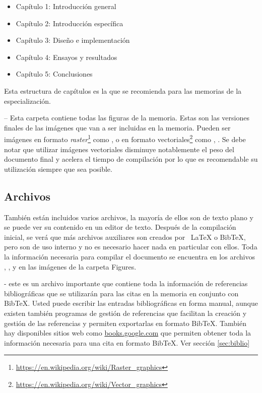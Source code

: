 \begin{itemize}
\item Capítulo 1: Introducción general	
\item Capítulo 2: Introducción específica
\item Capítulo 3: Diseño e implementación
\item Capítulo 4: Ensayos y resultados
\item Capítulo 5: Conclusiones

\end{itemize}

Esta estructura de capítulos es la que se recomienda para las memorias de la especialización.

 -- Esta carpeta contiene todas las figuras de la memoria.  Estas son las versiones finales de las imágenes que van a ser incluidas en la memoria.  Pueden ser imágenes en formato \textit{raster}\footnote{\url{https://en.wikipedia.org/wiki/Raster_graphics}} como ,  o en formato vectoriales\footnote{\url{https://en.wikipedia.org/wiki/Vector_graphics}} como , .  Se debe notar que utilizar imágenes vectoriales disminuye notablemente el peso del documento final y acelera el tiempo de compilación por lo que es recomendable su utilización siempre que sea posible.

\subsection{Archivos}

También están incluidos varios archivos, la mayoría de ellos son de texto plano y se puede ver su contenido en un editor de texto. Después de la compilación inicial, se verá que más archivos auxiliares son creados por \ LaTeX{} o BibTeX, pero son de uso interno y no es necesario hacer nada en particular con ellos.  Toda la información necesaria para compilar el documento se encuentra en los archivos , ,  y en las imágenes de la carpeta Figures.

 - este es un archivo importante que contiene toda la información de referencias bibliográficas que se utilizarán para las citas en la memoria en conjunto con BibTeX. Usted puede escribir las entradas bibliográficas en forma manual, aunque existen también programas de gestión de referencias que facilitan la creación y gestión de las referencias y permiten exportarlas en formato BibTeX.  También hay disponibles sitios web como \url{books.google.com} que permiten obtener toda la información necesaria para una cita en formato BibTeX. Ver sección \ref{sec:biblio}

